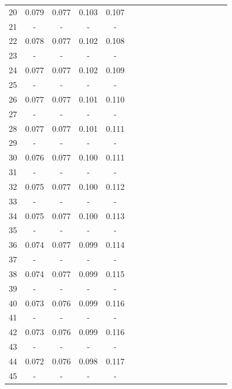 \documentclass{report}
\begin{document}
\begin{table}
\begin{tabular}{|c|cccc|cccc|cccc|cccc|}
20 & 0.079 & 0.077 & 0.103 & 0.107 & & & & & & & & & & & &\\
21 &   -   &   -   &   -   &   -   & & & & & & & & & & & &\\
22 & 0.078 & 0.077 & 0.102 & 0.108 & & & & & & & & & & & &\\
23 &   -   &   -   &   -   &   -   & & & & & & & & & & & &\\
24 & 0.077 & 0.077 & 0.102 & 0.109 & & & & & & & & & & & &\\
25 &   -   &   -   &   -   &   -   & & & & & & & & & & & &\\
26 & 0.077 & 0.077 & 0.101 & 0.110 & & & & & & & & & & & &\\
27 &   -   &   -   &   -   &   -   & & & & & & & & & & & &\\
28 & 0.077 & 0.077 & 0.101 & 0.111 & & & & & & & & & & & &\\
29 &   -   &   -   &   -   &   -   & & & & & & & & & & & &\\
30 & 0.076 & 0.077 & 0.100 & 0.111 & & & & & & & & & & & &\\
31 &   -   &   -   &   -   &   -   & & & & & & & & & & & &\\
32 & 0.075 & 0.077 & 0.100 & 0.112 & & & & & & & & & & & &\\
33 &   -   &   -   &   -   &   -   & & & & & & & & & & & &\\
34 & 0.075 & 0.077 & 0.100 & 0.113 & & & & & & & & & & & &\\
35 &   -   &   -   &   -   &   -   & & & & & & & & & & & &\\
36 & 0.074 & 0.077 & 0.099 & 0.114 & & & & & & & & & & & &\\
37 &   -   &   -   &   -   &   -   & & & & & & & & & & & &\\
38 & 0.074 & 0.077 & 0.099 & 0.115 & & & & & & & & & & & &\\
39 &   -   &   -   &   -   &   -   & & & & & & & & & & & &\\
40 & 0.073 & 0.076 & 0.099 & 0.116 & & & & & & & & & & & &\\
41 &   -   &   -   &   -   &   -   & & & & & & & & & & & &\\
42 & 0.073 & 0.076 & 0.099 & 0.116 & & & & & & & & & & & &\\
43 &   -   &   -   &   -   &   -   & & & & & & & & & & & &\\
44 & 0.072 & 0.076 & 0.098 & 0.117 & & & & & & & & & & & &\\
45 &   -   &   -   &   -   &   -   & & & & & & & & & & & &\\

\end{tabular}
\end{table}
\end{document}
